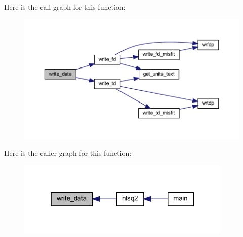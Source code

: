 Here is the call graph for this function\+:\nopagebreak
\begin{figure}[H]
\begin{center}
\leavevmode
\includegraphics[width=350pt]{Leroi_8f90_a8213ad17958b78aad4a7bec6b845606b_cgraph}
\end{center}
\end{figure}
Here is the caller graph for this function\+:\nopagebreak
\begin{figure}[H]
\begin{center}
\leavevmode
\includegraphics[width=291pt]{Leroi_8f90_a8213ad17958b78aad4a7bec6b845606b_icgraph}
\end{center}
\end{figure}
\mbox{\label{Leroi_8f90_ab3f62aa9d1d60322e81296cc809df15f}} 

